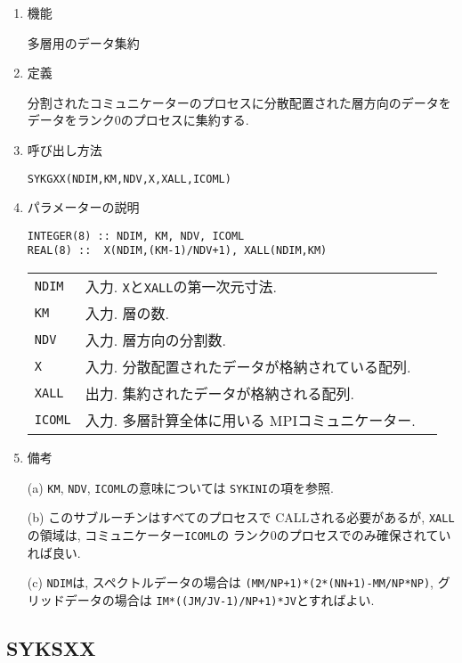 \documentclass[a4j]{jsarticle}
\begin{document}
\begin{enumerate}

\item 機能 

多層用のデータ集約  

\item 定義

分割されたコミュニケーターのプロセスに分散配置された層方向のデータを
  データをランク0のプロセスに集約する.

\item 呼び出し方法 

\texttt{SYKGXX(NDIM,KM,NDV,X,XALL,ICOML)}
  
\item パラメーターの説明

\begin{verbatim}        
INTEGER(8) :: NDIM, KM, NDV, ICOML
REAL(8) ::  X(NDIM,(KM-1)/NDV+1), XALL(NDIM,KM)
\end{verbatim}      

\begin{tabular}{lll}
\texttt{NDIM} & 入力. \texttt{X}と\texttt{XALL}の第一次元寸法.\\
\texttt{KM} & 入力. 層の数.\\
\texttt{NDV} & 入力. 層方向の分割数.\\
\texttt{X} & 入力. 分散配置されたデータが格納されている配列.\\
\texttt{XALL} & 出力. 集約されたデータが格納される配列.\\
\texttt{ICOML} & 入力. 多層計算全体に用いる MPIコミュニケーター.
\end{tabular}

\item 備考

(a) \texttt{KM}, \texttt{NDV}, \texttt{ICOML}の意味については
   \texttt{SYKINI}の項を参照.

(b) このサブルーチンはすべてのプロセスで CALLされる必要があるが,
\texttt{XALL}の領域は, コミュニケーター\texttt{ICOML}の
ランク0のプロセスでのみ確保されていれば良い.

(c) \texttt{NDIM}は, スペクトルデータの場合は
\texttt{(MM/NP+1)*(2*(NN+1)-MM/NP*NP)}, グリッドデータの場合は
\texttt{IM*((JM/JV-1)/NP+1)*JV}とすればよい.

\end{enumerate}


\subsection{SYKSXX}
\end{document}
